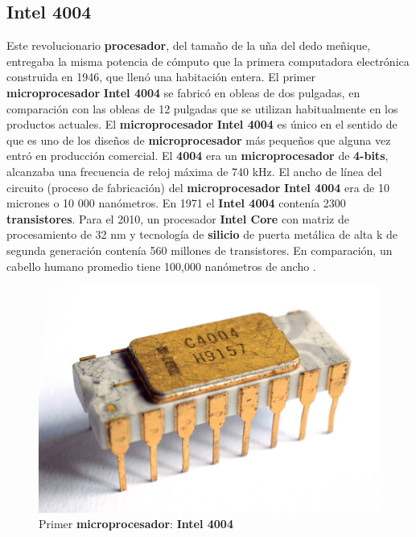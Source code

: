 \subsection{Intel 4004}
Este revolucionario \textbf{procesador}, del tamaño de la uña del dedo meñique, entregaba la misma potencia de cómputo que la primera
computadora electrónica construida en 1946, que llenó una habitación entera. El primer \textbf{microprocesador} \textbf{Intel 4004} se
fabricó en obleas de dos pulgadas, en comparación con las obleas de 12 pulgadas que se utilizan habitualmente en los productos actuales.
El \textbf {microprocesador} \textbf{Intel 4004} es único en el sentido de que es uno de los diseños de \textbf{microprocesador} más
pequeños que alguna vez entró en producción comercial. El \textbf{4004}  era un \textbf{microprocesador} de \textbf{4-bits}, alcanzaba una 
frecuencia de reloj máxima de 740 kHz. El ancho de línea del circuito (proceso de fabricación) del \textbf{microprocesador} \textbf{Intel 4004} 
era de 10 micrones o 10 000 nanómetros. En 1971 el \textbf{Intel 4004} contenía 2300 \textbf{transistores}. Para el 2010, un procesador \textbf{Intel Core} con matriz de procesamiento
de 32 nm y tecnología de \textbf{silicio} de puerta metálica de alta k de segunda generación contenía  560 millones de transistores. En comparación,
un cabello humano promedio tiene 100,000 nanómetros de ancho .      

\begin{figure}[htb]
	\centering
	\includegraphics[scale = 0.15]{Graphics/Intel_C4004.jpg}
	\caption{Primer \textbf{microprocesador}: \textbf{Intel 4004}}
	\label{fig:12}
\end{figure}


